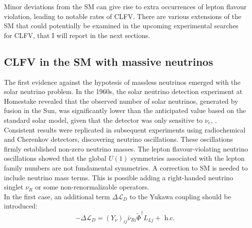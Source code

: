 Minor deviations from the SM can give rise to extra 
occurrences of lepton flavour violation, leading to notable rates of CLFV.
There are various extensions of the SM that could potentially 
be examined in the upcoming experimental searches for CLFV, that 
I will report in the next sections.


\subsection{CLFV in the SM with massive neutrinos}\label{massiveneutrinos}
The first evidence against the hypotesis of massless neutrinos emerged with the solar neutrino problem. In the 1960s, the solar neutrino detection experiment at Homestake revealed that the observed number of solar neutrinos, generated by fusion in the Sun, was significantly lower than the anticipated value based on the standard solar model, given that the detector was only sensitive to $\nu_e$, \cite{PhysRevLett.20.1205}. Consistent results were replicated in subsequent experiments using radiochemical and Cherenkov detectors, discovering neutrino oscillations. These oscillations firmly established non-zero neutrino masses. The lepton flavour-violating neutrino oscillations showed that the global $U(1)$ symmetries associated with the lepton family numbers are not fundamental symmetries. A correction to SM is needed to include neutrino mass terms. This is possible adding a right-handed neutrino singlet $\nu_R$ or some non-renormalizable operators.
\\
In the first case, an additional term $\Delta \mathscr{L}_D$ to the Yukawa coupling should be introduced:
\begin{equation}
-\Delta \mathscr{L}_D=\left(Y_\nu\right)_{i j} \bar{\nu}_{R i}  \widetilde{\Phi}^\dagger L_{Lj}+\text { h.c. }
\end{equation}

